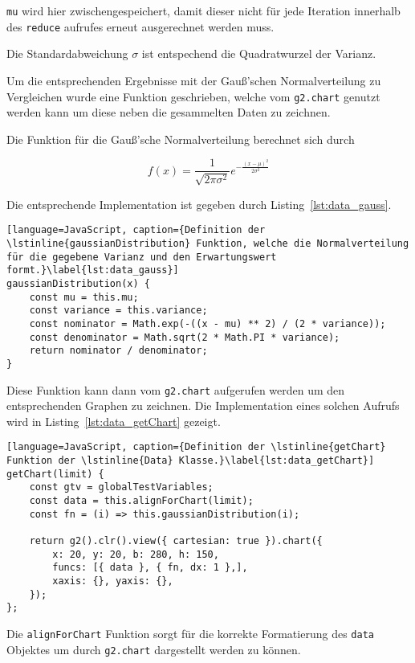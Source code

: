 \lstinline{mu} wird hier zwischengespeichert, damit dieser nicht für jede Iteration innerhalb des \lstinline{reduce} aufrufes erneut ausgerechnet werden muss.

Die Standardabweichung $\sigma$ ist entspechend die Quadratwurzel der Varianz.

Um die entsprechenden Ergebnisse mit der Gauß'schen Normalverteilung zu Vergleichen wurde eine Funktion geschrieben, welche vom \lstinline{g2.chart} genutzt werden kann um diese neben die gesammelten Daten zu zeichnen.

Die Funktion für die Gauß'sche Normalverteilung berechnet sich durch

\begin{equation}
    f(x) = \frac{1}{\sqrt{2\pi\sigma^2}}e^{-\frac{(x-\mu)^2}{2\sigma^2}}
\end{equation}

Die entsprechende Implementation ist gegeben durch Listing~\ref{lst:data_gauss}.

\begin{lstlisting}[language=JavaScript, caption={Definition der \lstinline{gaussianDistribution} Funktion, welche die Normalverteilung für die gegebene Varianz und den Erwartungswert formt.}\label{lst:data_gauss}]
gaussianDistribution(x) {
    const mu = this.mu;
    const variance = this.variance;
    const nominator = Math.exp(-((x - mu) ** 2) / (2 * variance));
    const denominator = Math.sqrt(2 * Math.PI * variance);
    return nominator / denominator;
}
\end{lstlisting}

Diese Funktion kann dann vom \lstinline{g2.chart} aufgerufen werden um den entsprechenden Graphen zu zeichnen.
Die Implementation eines solchen Aufrufs wird in Listing~\ref{lst:data_getChart} gezeigt.

\begin{lstlisting}[language=JavaScript, caption={Definition der \lstinline{getChart} Funktion der \lstinline{Data} Klasse.}\label{lst:data_getChart}]
getChart(limit) {
    const gtv = globalTestVariables;
    const data = this.alignForChart(limit);
    const fn = (i) => this.gaussianDistribution(i);

    return g2().clr().view({ cartesian: true }).chart({
        x: 20, y: 20, b: 280, h: 150,
        funcs: [{ data }, { fn, dx: 1 },],
        xaxis: {}, yaxis: {},
    });
};
\end{lstlisting}

Die \lstinline{alignForChart} Funktion sorgt für die korrekte Formatierung des \lstinline{data} Objektes um durch \lstinline{g2.chart} dargestellt werden zu können.

